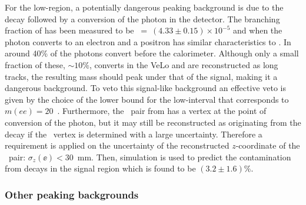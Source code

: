 For the low-\qsq region, a potentially dangerous peaking background is due to the \BdToKstG decay followed by a conversion
of the photon in the detector. The branching fraction of \BdToKstG has been measured to be \mbox{\BF~= $(4.33 \pm 0.15)\times 10^{-5}$} and 
when the photon converts to an electron and a positron has similar characteristics to \BdKstee. 
In \lhcb around 40\% of the photons convert before the calorimeter. Although only a small fraction of these, $\sim 10\%$, converts
in the VeLo and are reconstructed as long tracks, the resulting \Bd mass should peak under that of the signal, making it a dangerous background. 
To veto this signal-like background an effective veto is given by the choice of the lower bound for the low-\qsq interval that corresponds to 
$m(ee)=20$~\mevcc. Furthermore, the \ee~pair from \BdToKstGee has a vertex at the point of conversion of the photon, but it may still be
reconstructed as originating from the \Bd decay if the \ee~vertex is determined with a large uncertainty. 
Therefore a requirement is applied on the uncertainty of the reconstructed $z$-coordinate of the \ee~pair: $\sigma_z(\ee) < 30$~mm.
Then, simulation is used to predict the contamination from \BdToKstGee decays in the signal region which is found to be $(3.2\pm1.6)\%$.



\subsubsection{Other peaking backgrounds}


